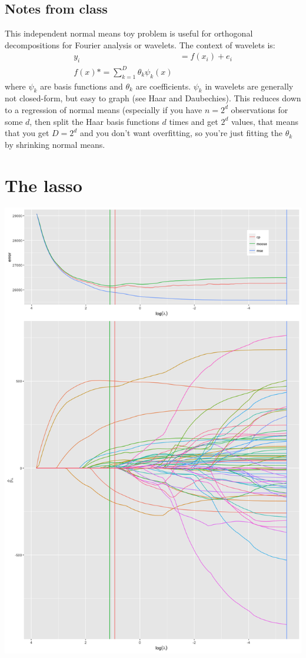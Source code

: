 \documentclass{article}
\begin{document}
\subsection{Notes from class}
This independent normal means toy problem is useful for orthogonal decompositions for Fourier analysis or wavelets.
The context of wavelets is:
\begin{align*}
y_i&=f(x_i)+e_i\\
f(x)*=\sum_{k=1}^D \theta_k \psi_k(x)
\end{align*}
where $\psi_k$ are basis functions and $\theta_k$ are coefficients. $\psi_k$ in wavelets are generally not closed-form, but
easy to graph (see Haar and Daubechies). This reduces down to a regression of normal means (especially if you have $n=2^d$ observations for some $d$, then split the Haar basis functions $d$ times and get $2^d$ values, that means
that you get $D=2^d$ and you don't want overfitting, so you're just fitting the $\theta_k$ by shrinking normal means.


\section{The lasso}

\includegraphics[scale=0.35]{overall.png}
\end{document}
